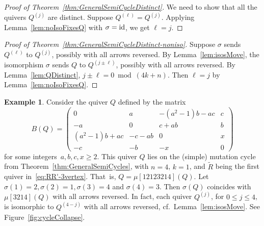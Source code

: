 \documentclass[11pt, letterpaper]{amsart}
\theoremstyle{definition}
\newtheorem{example}[theorem]{Example}
\numberwithin{equation}{section}
\newcommand{\T}[2]{\mu[#1](#2)} %
\begin{document}
\begin{proof}[Proof of Theorem~\ref{thm:GeneralSemiCycleDistinct}]
We need to show that all the quivers $Q^{(j)}$ are distinct.
Suppose ${Q^{(\ell)} = Q^{(j)}}$. 
Applying Lemma~\ref{lem:noIsoFixesQ} with $\sigma=\textup{id}$, we get $\ell = j$.
\end{proof}

\begin{proof}[Proof of Theorem~\ref{thm:GeneralSemiCycleDistinct-noniso}]
Suppose $\sigma$ sends $Q^{(\ell)}$ to $Q^{(j)}$, possibly with all arrows reversed. 
By Lemma~\ref{lem:isosMove}, the isomorphism $\sigma$ sends $Q$ to $Q^{(j \pm \ell)}$,
possibly with all arrows reversed.
By Lemma~\ref{lem:QDistinct}, $j \pm \ell = 0\bmod\!(4k+n)$.
Then $\ell=j$ by Lemma~\ref{lem:noIsoFixesQ}.
\end{proof}


\begin{example}
\label{eg:4vertexSymmetric}
Consider the quiver $Q$ defined by the matrix
\[
B(Q) = \begin{pmatrix} 
0 & a & -(a^2-1)b -ac & c \\
-a & 0 & c + ab & b \\
(a^2-1)b +ac & -c-ab & 0 & x \\
-c & -b & -x & 0
\end{pmatrix}
\]
for some integers~$a,b,c,x\ge 2$. 
This quiver $Q$ lies on the (simple) mutation cycle from Theorem~\ref{thm:GeneralSemiCycles}, with $n=4$, $k=1$, 
and $\tilde R$ being the first quiver in~\eqref{eq:RR'-3vertex}. 
That~is, $Q = \T{1 2 123 21 4}{Q}$. 
Let $\sigma(1)=2, \sigma(2)=1, \sigma(3)=4$ and $\sigma(4)=3$. 
Then $\sigma(Q)$ coincides with $\T{3 2 1 4}{Q}$ with all arrows reversed. 
In fact, each quiver $Q^{(j)}$, for $0\le j\le 4$, is isomorphic to $Q^{(4-j)}$ with all arrows reversed, 
cf.\ Lemma~\ref{lem:isosMove}. %
See Figure~\ref{fig:cycleCollapse}.
\end{example}
\end{document}
